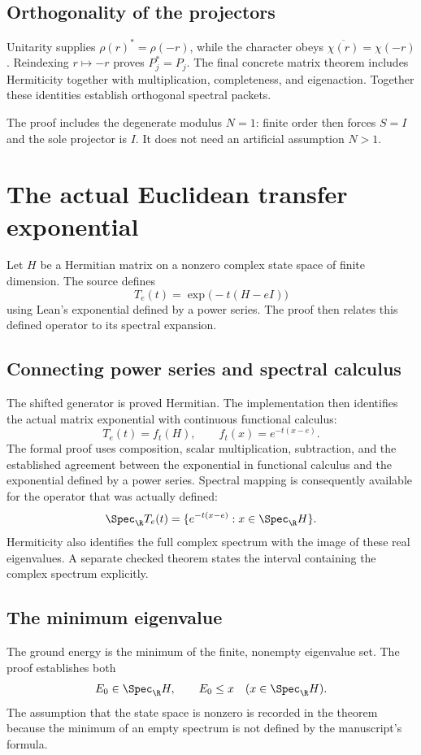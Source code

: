 \subsection{Orthogonality of the projectors}
Unitarity supplies $\rho(r)^*=\rho(-r)$, while the character obeys $\overline{\chi(r)}=\chi(-r)$. Reindexing $r\mapsto-r$ proves $P_j^*=P_j$. The final concrete matrix theorem includes Hermiticity together with multiplication, completeness, and eigenaction. Together these identities establish orthogonal spectral packets.

The proof includes the degenerate modulus $N=1$: finite order then forces $S=I$ and the sole projector is $I$. It does not need an artificial assumption $N>1$.





\section{The actual Euclidean transfer exponential}\label{supp3:section:004}
Let $H$ be a Hermitian matrix on a nonzero complex state space of finite dimension. The source defines
\[
T_e(t)=\exp\bigl(-t(H-eI)\bigr)
\]
using Lean's exponential defined by a power series. The proof then relates this defined operator to its spectral expansion.

\subsection{Connecting power series and spectral calculus}
The shifted generator is proved Hermitian. The implementation then identifies the actual matrix exponential with continuous functional calculus:
\[
\boxed{T_e(t)=f_t(H),\qquad f_t(x)=e^{-t(x-e)}.}
\]
The formal proof uses composition, scalar multiplication, subtraction, and the established agreement between the exponential in functional calculus and the exponential defined by a power series. Spectral mapping is consequently available for the operator that was actually defined:
\[
\Spec_\R T_e(t)=\{e^{-t(x-e)}:x\in\Spec_\R H\}.
\]
Hermiticity also identifies the full complex spectrum with the image of these real eigenvalues. A separate checked theorem states the interval containing the complex spectrum explicitly.

\subsection{The minimum eigenvalue}
The ground energy is the minimum of the finite, nonempty eigenvalue set. The proof establishes both
\[
E_0\in\Spec_\R H,\qquad E_0\le x\quad(x\in\Spec_\R H).
\]
The assumption that the state space is nonzero is recorded in the theorem because the minimum of an empty spectrum is not defined by the manuscript's formula.

